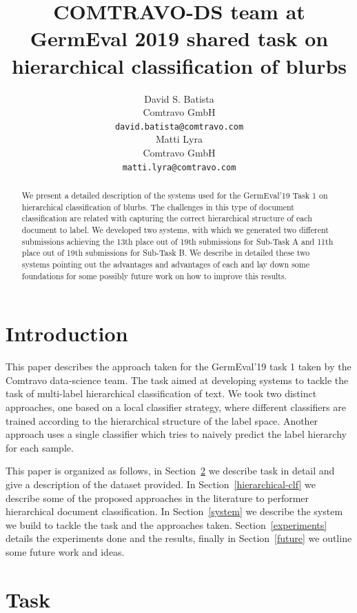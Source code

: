 \documentclass[11pt,a4paper]{article}
\title{COMTRAVO-DS team at GermEval 2019 shared task on hierarchical classification of blurbs}
\author{David S. Batista \\
  Comtravo GmbH \\
  {\tt david.batista@comtravo.com} \\\And
  Matti Lyra \\
  Comtravo GmbH \\
  {\tt matti.lyra@comtravo.com} \\}
\date{}
\begin{document}
\maketitle

\begin{abstract}
We present a detailed description of the systems used for the GermEval'19 Task 1
on hierarchical classification of blurbs. The challenges in this type of document
classification are related with capturing the correct hierarchical structure of
each document to label.
We developed two systems, with which we generated two different submissions
achieving the 13th place out of 19th submissions for Sub-Task A and 11th place
out of 19th submissions for Sub-Task B. We describe in detailed these two systems
pointing out the advantages and advantages of each and lay down some foundations
for some possibly future work on how to improve this results.
\end{abstract}




\section{Introduction}

This paper describes the approach taken for the GermEval'19 task 1 taken by the
Comtravo data-science team. The task aimed at developing systems to tackle the
task of multi-label hierarchical classification of text. We took two distinct
approaches, one based on a local classifier strategy, where different classifiers
are trained according to the hierarchical structure of the label space. Another
approach uses a single classifier which tries to naively predict the label
hierarchy for each sample.

This paper is organized as follows, in Section~\ref{task} we describe task in
detail and give a description of the dataset provided. In Section~\ref{hierarchical-clf}
we describe some of the proposed approaches in the literature to performer
hierarchical document classification. In Section~\ref{system} we describe the
system we build to tackle the task and the approaches taken. Section~\ref{experiments}
details the experiments done and the results, finally in Section~\ref{future} we
outline some future work and ideas.



\section{Task}\label{task}
\end{document}
